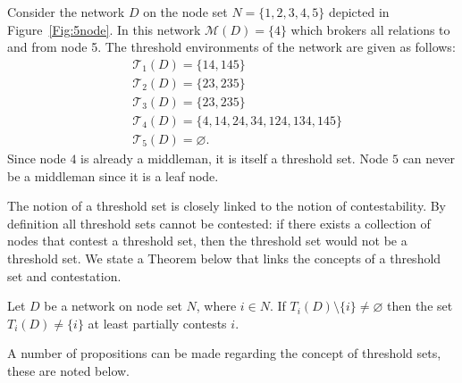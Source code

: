 \begin{example} \label{5node}
Consider the network $D$ on the node set $N= \{1,2,3,4,5\}$ depicted in Figure~\ref{Fig:5node}. In this network $\mathcal{M}(D) = \{4\}$ which brokers all relations to and from node 5. The threshold environments of the network are given as follows:
\begin{align*}
&\mathcal{T}_{1}(D) = \{14, 145\}\\
&\mathcal{T}_{2}(D) = \{23, 235\}\\
&\mathcal{T}_{3}(D) = \{23, 235\}\\
&\mathcal{T}_{4}(D) = \{4, 14, 24, 34, 124, 134, 145\}\\
&\mathcal{T}_{5}(D) = \varnothing .
\end{align*}
Since node $4$ is already a middleman, it is itself a threshold set. Node $5$ can never be a middleman since it is a leaf node.
\end{example}

The notion of a threshold set is closely linked to the notion of contestability. By definition all threshold sets cannot be contested: if there exists a collection of nodes that contest a threshold set, then the threshold set would not be a threshold set. We state a Theorem below that links the concepts of a threshold set and contestation.

\begin{theorem}
Let $D$ be a network on node set $N$, where $i \in N$. If $T_{i}(D) \setminus \{i\} \neq \varnothing$ then the set $T_{i}(D) \neq \{i\}$ at least partially contests $i$.  
\end{theorem}

A number of propositions can be made regarding the concept of threshold sets, these are noted below.

